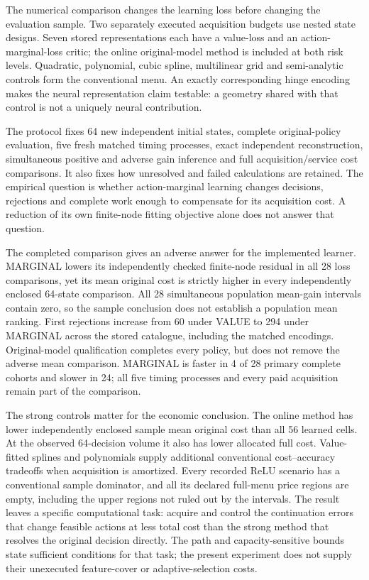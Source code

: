 The numerical comparison changes the learning loss before changing the
evaluation sample. Two separately executed acquisition budgets use nested
state designs. Seven stored representations each have a value-loss and an
action-marginal-loss critic; the online original-model method is included at
both risk levels. Quadratic, polynomial, cubic spline, multilinear grid and
semi-analytic controls form the conventional menu. An exactly corresponding
hinge encoding makes the neural representation claim testable: a geometry
shared with that control is not a uniquely neural contribution.

The protocol fixes 64 new independent initial states, complete original-policy
evaluation, five fresh matched timing processes, exact independent
reconstruction, simultaneous positive and adverse gain inference and full
acquisition/service cost comparisons. It also fixes how unresolved and failed
calculations are retained. The empirical question is whether action-marginal
learning changes decisions, rejections and complete work enough to compensate
for its acquisition cost. A reduction of its own finite-node fitting objective
alone does not answer that question.

The completed comparison gives an adverse answer for the implemented learner.
MARGINAL lowers its independently checked finite-node residual in all 28
loss comparisons, yet its mean original cost is strictly higher in every
independently enclosed 64-state comparison. All 28 simultaneous population
mean-gain intervals contain zero, so the sample conclusion does not establish
a population mean ranking. First rejections increase from 60 under VALUE to
294 under MARGINAL across the stored catalogue, including the matched
encodings. Original-model qualification completes every policy, but does not
remove the adverse mean comparison. MARGINAL is faster in 4 of 28 primary
complete cohorts and slower in 24; all five timing processes and every paid
acquisition remain part of the comparison.

The strong controls matter for the economic conclusion. The online method has
lower independently enclosed sample mean original cost than all 56 learned
cells. At the observed 64-decision volume it also has lower allocated full
cost. Value-fitted splines and polynomials supply additional conventional
cost--accuracy tradeoffs when acquisition is amortized. Every recorded ReLU
scenario has a conventional sample dominator, and all its declared full-menu
price regions are empty, including the upper regions not ruled out by the
intervals. The result leaves a specific computational task: acquire and
control the continuation errors that change feasible actions at less total
cost than the strong method that resolves the original decision directly.
The path and capacity-sensitive bounds state sufficient conditions for that
task; the present experiment does not supply their unexecuted feature-cover
or adaptive-selection costs.

